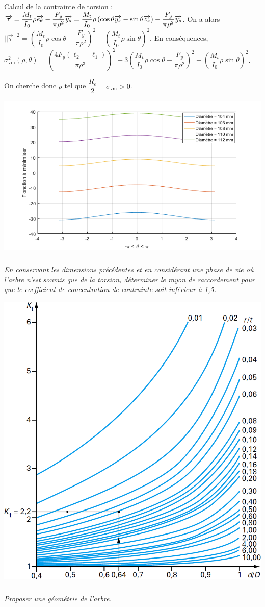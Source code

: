 \documentclass[10pt,fleqn]{article} %
\begin{document}
Calcul de la contrainte de torsion : 
$\overrightarrow{\tau}=\dfrac{M_t}{I_{0}}\rho \overrightarrow{e_{\theta}} - \dfrac{F_y}{\pi \rho^2} \overrightarrow{y_s}
= \dfrac{M_t}{I_{0}}\rho \left( \cos\theta \overrightarrow{y_{s}}-\sin\theta \overrightarrow{z_{s}}\right) - \dfrac{F_y}{\pi \rho^2} \overrightarrow{y_s}$. 
On a alors $||\overrightarrow{\tau}||^2 = \left(\dfrac{M_t}{I_{0}}\rho  \cos\theta -  \dfrac{F_y}{\pi \rho^2} \right)^2 +   \left(\dfrac{M_t}{I_{0}}\rho  \sin\theta  \right)^2$. 
En conséquences, 
$\sigma_{\text{vm}}^2\left( \rho,\theta\right)=\left( \dfrac{4 F_y\left( \ell_2 - \ell_1 \right)}{\pi \rho^3} \right)^2 + 3 \left(\dfrac{M_t}{I_{0}}\rho  \cos\theta -  \dfrac{F_y}{\pi \rho^2} \right)^2 +   \left(\dfrac{M_t}{I_{0}}\rho  \sin\theta  \right)^2$.

On cherche donc $\rho$ tel que $\dfrac{R_e}{2}-\sigma_{\text{vm}}>0$.




\begin{center}
\includegraphics[width=.5\linewidth]{images/untitled}
\end{center}

\subparagraph{}\textit{En conservant les dimensions précédentes et en considérant une phase de vie où l'arbre n'est soumis que de la torsion, déterminer le rayon de raccordement pour que le coefficient de concentration de contrainte soit inférieur à 1,5.}

\begin{center}
\includegraphics[width=.5\linewidth]{images/concentration_contrainte_torsion}
\end{center}


\subparagraph{}\textit{Proposer une géométrie de l'arbre.}
\end{document}
